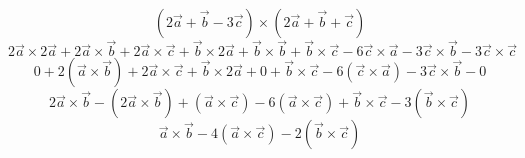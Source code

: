 \documentclass{article}
\begin{document}
\[ (2\vec{a} + \vec{b} - 3\vec{c}) \times (2\vec{a} + \vec{b} + \vec{c}) \]
\[ 2\vec{a} \times 2\vec{a} + 2\vec{a} \times \vec{b} + 2\vec{a} \times \vec{c} + \vec{b} \times 2\vec{a} + \vec{b} \times \vec{b} + \vec{b} \times \vec{c} - 6\vec{c} \times \vec{a} - 3\vec{c} \times \vec{b} - 3\vec{c} \times \vec{c} \]
\[ 0 + 2(\vec{a} \times \vec{b}) + 2\vec{a} \times \vec{c} + \vec{b} \times 2\vec{a} + 0 + \vec{b} \times \vec{c} - 6(\vec{c} \times \vec{a}) - 3\vec{c} \times \vec{b} - 0 \]
\[ 2\vec{a} \times \vec{b} - (2\vec{a} \times \vec{b}) + (\vec{a} \times \vec{c}) - 6(\vec{a} \times \vec{c}) + \vec{b} \times \vec{c} - 3(\vec{b} \times \vec{c}) \]
\[ \vec{a} \times \vec{b} - 4(\vec{a} \times \vec{c}) - 2(\vec{b} \times \vec{c}) \]
\end{document}
